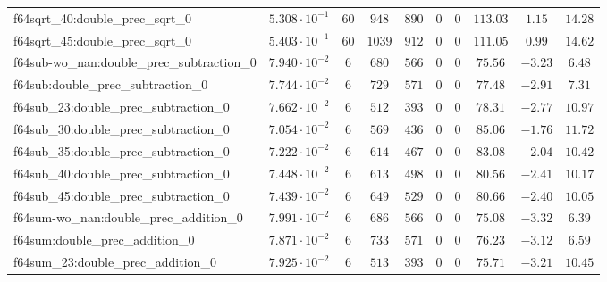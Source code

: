 \begin{tabular}{|l|c|c|c|c|c|c|c|c|c|}
f64sqrt\_40:double\_prec\_sqrt\_0              & $ 5.308 \cdot 10^{-1} $ & $ 60     $ & $ 948    $ & $ 890   $ & $ 0   $ & $ 0  $ & $ 113.03      $ & $ 1.15    $ & $ 14.28   $ \\
f64sqrt\_45:double\_prec\_sqrt\_0              & $ 5.403 \cdot 10^{-1} $ & $ 60     $ & $ 1039   $ & $ 912   $ & $ 0   $ & $ 0  $ & $ 111.05      $ & $ 0.99    $ & $ 14.62   $ \\
f64sub-wo\_nan:double\_prec\_subtraction\_0    & $ 7.940 \cdot 10^{-2} $ & $ 6      $ & $ 680    $ & $ 566   $ & $ 0   $ & $ 0  $ & $ 75.56       $ & $ -3.23   $ & $ 6.48    $ \\
f64sub:double\_prec\_subtraction\_0            & $ 7.744 \cdot 10^{-2} $ & $ 6      $ & $ 729    $ & $ 571   $ & $ 0   $ & $ 0  $ & $ 77.48       $ & $ -2.91   $ & $ 7.31    $ \\
f64sub\_23:double\_prec\_subtraction\_0        & $ 7.662 \cdot 10^{-2} $ & $ 6      $ & $ 512    $ & $ 393   $ & $ 0   $ & $ 0  $ & $ 78.31       $ & $ -2.77   $ & $ 10.97   $ \\
f64sub\_30:double\_prec\_subtraction\_0        & $ 7.054 \cdot 10^{-2} $ & $ 6      $ & $ 569    $ & $ 436   $ & $ 0   $ & $ 0  $ & $ 85.06       $ & $ -1.76   $ & $ 11.72   $ \\
f64sub\_35:double\_prec\_subtraction\_0        & $ 7.222 \cdot 10^{-2} $ & $ 6      $ & $ 614    $ & $ 467   $ & $ 0   $ & $ 0  $ & $ 83.08       $ & $ -2.04   $ & $ 10.42   $ \\
f64sub\_40:double\_prec\_subtraction\_0        & $ 7.448 \cdot 10^{-2} $ & $ 6      $ & $ 613    $ & $ 498   $ & $ 0   $ & $ 0  $ & $ 80.56       $ & $ -2.41   $ & $ 10.17   $ \\
f64sub\_45:double\_prec\_subtraction\_0        & $ 7.439 \cdot 10^{-2} $ & $ 6      $ & $ 649    $ & $ 529   $ & $ 0   $ & $ 0  $ & $ 80.66       $ & $ -2.40   $ & $ 10.05   $ \\
f64sum-wo\_nan:double\_prec\_addition\_0       & $ 7.991 \cdot 10^{-2} $ & $ 6      $ & $ 686    $ & $ 566   $ & $ 0   $ & $ 0  $ & $ 75.08       $ & $ -3.32   $ & $ 6.39    $ \\
f64sum:double\_prec\_addition\_0               & $ 7.871 \cdot 10^{-2} $ & $ 6      $ & $ 733    $ & $ 571   $ & $ 0   $ & $ 0  $ & $ 76.23       $ & $ -3.12   $ & $ 6.59    $ \\
f64sum\_23:double\_prec\_addition\_0           & $ 7.925 \cdot 10^{-2} $ & $ 6      $ & $ 513    $ & $ 393   $ & $ 0   $ & $ 0  $ & $ 75.71       $ & $ -3.21   $ & $ 10.45   $ \\

\end{tabular}
